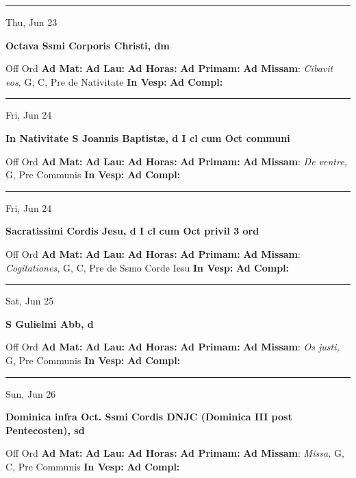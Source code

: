 \documentclass[letterpaper, 10pt]{article}
\begin{document}
\hrule
\begin{center}
Thu, Jun 23
\end{center}\textbf{ \large Octava Ssmi Corporis Christi, \textnormal{\normalsize dm}}
\begin{justify}
Off Ord
\textbf{Ad Mat: }
\textbf{Ad Lau: }
\textbf{Ad Horas: }
\textbf{Ad Primam: }
\textbf{Ad Missam}: \textit{Cibavit eos,} G, C, Pre de Nativitate
\textbf{In Vesp: }
\textbf{Ad Compl: }\end{justify}



\hrule
\begin{center}
Fri, Jun 24
\end{center}\textbf{ \large In Nativitate S Joannis Baptistæ, \textnormal{\normalsize d I cl cum Oct communi}}
\begin{justify}
Off Ord
\textbf{Ad Mat: }
\textbf{Ad Lau: }
\textbf{Ad Horas: }
\textbf{Ad Primam: }
\textbf{Ad Missam}: \textit{De ventre,} G, Pre Communis
\textbf{In Vesp: }
\textbf{Ad Compl: }\end{justify}



\hrule
\begin{center}
Fri, Jun 24
\end{center}\textbf{ \large Sacratissimi Cordis Jesu, \textnormal{\normalsize d I cl cum Oct privil 3 ord}}
\begin{justify}
Off Ord
\textbf{Ad Mat: }
\textbf{Ad Lau: }
\textbf{Ad Horas: }
\textbf{Ad Primam: }
\textbf{Ad Missam}: \textit{Cogitationes,} G, C, Pre de Ssmo Corde Iesu
\textbf{In Vesp: }
\textbf{Ad Compl: }\end{justify}



\hrule
\begin{center}
Sat, Jun 25
\end{center}\textbf{ \large S Gulielmi Abb, \textnormal{\normalsize d}}
\begin{justify}
Off Ord
\textbf{Ad Mat: }
\textbf{Ad Lau: }
\textbf{Ad Horas: }
\textbf{Ad Primam: }
\textbf{Ad Missam}: \textit{Os justi,} G, Pre Communis
\textbf{In Vesp: }
\textbf{Ad Compl: }\end{justify}



\hrule
\begin{center}
Sun, Jun 26
\end{center}\textbf{ \large Dominica infra Oct. Ssmi Cordis DNJC (Dominica III post Pentecosten), \textnormal{\normalsize sd}}
\begin{justify}
Off Ord
\textbf{Ad Mat: }
\textbf{Ad Lau: }
\textbf{Ad Horas: }
\textbf{Ad Primam: }
\textbf{Ad Missam}: \textit{Missa,} G, C, Pre Communis
\textbf{In Vesp: }
\textbf{Ad Compl: }\end{justify}
\end{document}
